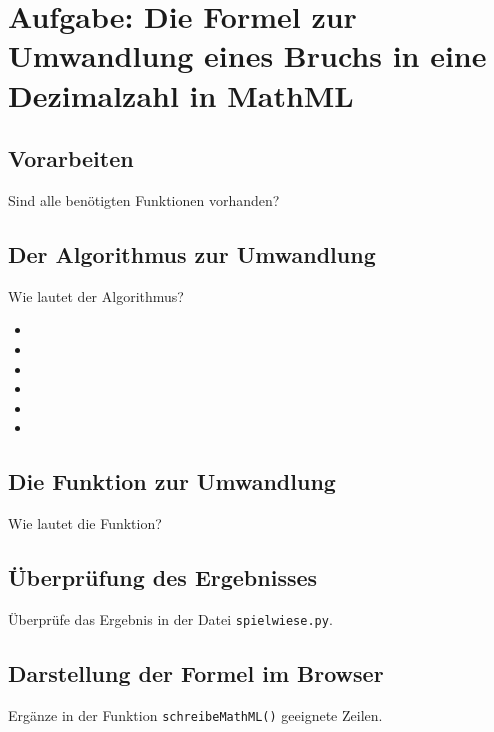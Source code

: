 \section{Aufgabe: Die Formel zur Umwandlung eines Bruchs in eine Dezimalzahl in MathML}

\subsection*{Vorarbeiten}

Sind alle benötigten Funktionen vorhanden?

\subsection*{Der Algorithmus zur Umwandlung}

Wie lautet der Algorithmus?

{\huge
	\begin{itemize}
		\item  
		\item  
		\item  
		\item  
		\item  
		\item  
	\end{itemize}
}

\subsection*{Die Funktion zur Umwandlung}

Wie lautet die Funktion?

\subsection*{Überprüfung des Ergebnisses}

Überprüfe das Ergebnis in der Datei \texttt{spielwiese.py}.

\subsection*{Darstellung der Formel im Browser}

Ergänze in der Funktion \texttt{schreibeMathML()} geeignete Zeilen.